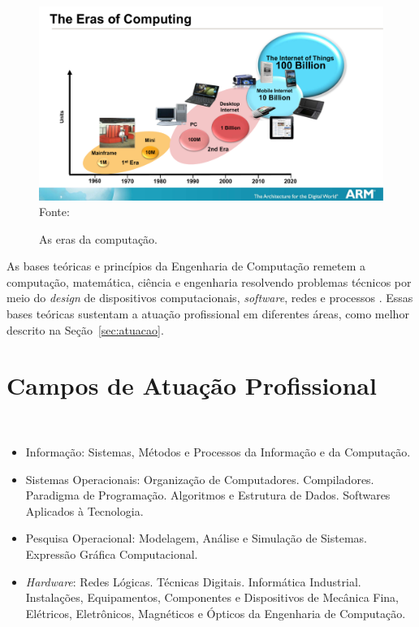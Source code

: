 \begin{figure}[H]
    \centering
    \caption{As eras da computação.}
    \label{fig:eras}
    \includegraphics[width=\textwidth]{enc/imagens/CompEras.pdf}
    Fonte:~\textcite{ARM2013}
\end{figure}


As bases teóricas e princípios da Engenharia de Computação remetem a computação, matemática, ciência e engenharia resolvendo problemas técnicos por meio do \textit{design} de dispositivos computacionais, \textit{software}, redes e processos \cite{CE2016}. Essas bases teóricas sustentam a atuação profissional em diferentes áreas, como melhor descrito na Seção~\ref{sec:atuacao}.


\section{Campos de Atuação Profissional}~\label{sec:atuacao}


\begin{itemize}
    \item Informação: Sistemas, Métodos e Processos da Informação e da Computação.
    \item Sistemas Operacionais: Organização de Computadores. Compiladores.
    Paradigma de Programação. Algoritmos e Estrutura de Dados. Softwares Aplicados à Tecnologia.
    \item Pesquisa Operacional: Modelagem, Análise e Simulação de Sistemas. Expressão Gráfica Computacional.
    \item \textit{Hardware}: Redes Lógicas. Técnicas Digitais. Informática Industrial.
    Instalações, Equipamentos, Componentes e Dispositivos de Mecânica Fina, Elétricos, Eletrônicos, Magnéticos e Ópticos da Engenharia de Computação.
\end{itemize}


